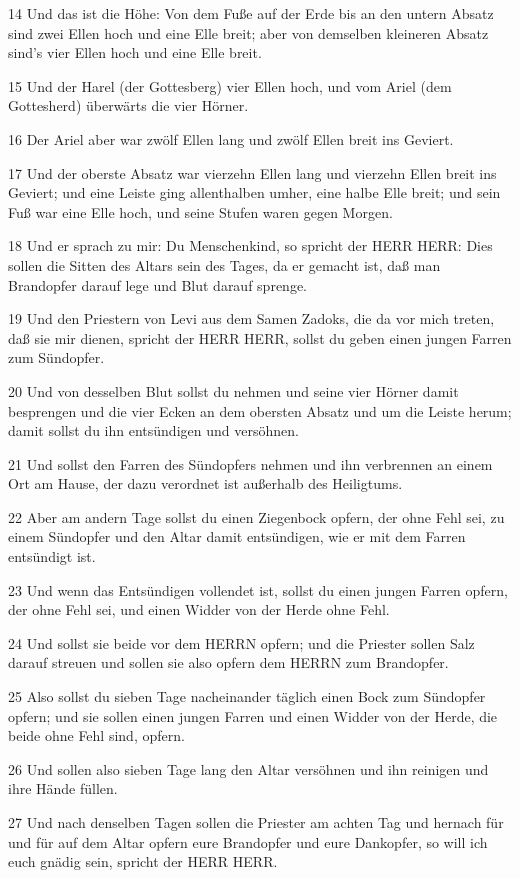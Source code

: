 \par 14 Und das ist die Höhe: Von dem Fuße auf der Erde bis an den untern Absatz sind zwei Ellen hoch und eine Elle breit; aber von demselben kleineren Absatz sind's vier Ellen hoch und eine Elle breit.
\par 15 Und der Harel (der Gottesberg) vier Ellen hoch, und vom Ariel (dem Gottesherd) überwärts die vier Hörner.
\par 16 Der Ariel aber war zwölf Ellen lang und zwölf Ellen breit ins Geviert.
\par 17 Und der oberste Absatz war vierzehn Ellen lang und vierzehn Ellen breit ins Geviert; und eine Leiste ging allenthalben umher, eine halbe Elle breit; und sein Fuß war eine Elle hoch, und seine Stufen waren gegen Morgen.
\par 18 Und er sprach zu mir: Du Menschenkind, so spricht der HERR HERR: Dies sollen die Sitten des Altars sein des Tages, da er gemacht ist, daß man Brandopfer darauf lege und Blut darauf sprenge.
\par 19 Und den Priestern von Levi aus dem Samen Zadoks, die da vor mich treten, daß sie mir dienen, spricht der HERR HERR, sollst du geben einen jungen Farren zum Sündopfer.
\par 20 Und von desselben Blut sollst du nehmen und seine vier Hörner damit besprengen und die vier Ecken an dem obersten Absatz und um die Leiste herum; damit sollst du ihn entsündigen und versöhnen.
\par 21 Und sollst den Farren des Sündopfers nehmen und ihn verbrennen an einem Ort am Hause, der dazu verordnet ist außerhalb des Heiligtums.
\par 22 Aber am andern Tage sollst du einen Ziegenbock opfern, der ohne Fehl sei, zu einem Sündopfer und den Altar damit entsündigen, wie er mit dem Farren entsündigt ist.
\par 23 Und wenn das Entsündigen vollendet ist, sollst du einen jungen Farren opfern, der ohne Fehl sei, und einen Widder von der Herde ohne Fehl.
\par 24 Und sollst sie beide vor dem HERRN opfern; und die Priester sollen Salz darauf streuen und sollen sie also opfern dem HERRN zum Brandopfer.
\par 25 Also sollst du sieben Tage nacheinander täglich einen Bock zum Sündopfer opfern; und sie sollen einen jungen Farren und einen Widder von der Herde, die beide ohne Fehl sind, opfern.
\par 26 Und sollen also sieben Tage lang den Altar versöhnen und ihn reinigen und ihre Hände füllen.
\par 27 Und nach denselben Tagen sollen die Priester am achten Tag und hernach für und für auf dem Altar opfern eure Brandopfer und eure Dankopfer, so will ich euch gnädig sein, spricht der HERR HERR.

